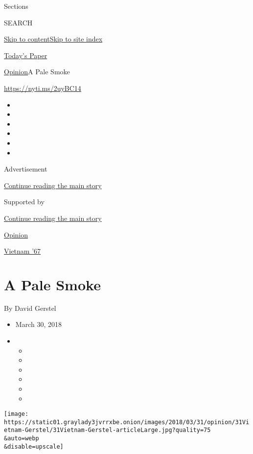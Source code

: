 Sections

SEARCH

\protect\hyperlink{site-content}{Skip to
content}\protect\hyperlink{site-index}{Skip to site index}

\href{https://myaccount.nytimes3xbfgragh.onion/auth/login?response_type=cookie\&client_id=vi}{}

\href{https://www.nytimes3xbfgragh.onion/section/todayspaper}{Today's
Paper}

\href{/section/opinion}{Opinion}\textbar{}A Pale Smoke

\url{https://nyti.ms/2uyBC14}

\begin{itemize}
\item
\item
\item
\item
\item
\item
\end{itemize}

Advertisement

\protect\hyperlink{after-top}{Continue reading the main story}

Supported by

\protect\hyperlink{after-sponsor}{Continue reading the main story}

\href{/section/opinion}{Opinion}

\href{/column/vietnam-67}{Vietnam '67}

\hypertarget{a-pale-smoke}{%
\section{A Pale Smoke}\label{a-pale-smoke}}

By David Gerstel

\begin{itemize}
\item
  March 30, 2018
\item
  \begin{itemize}
  \item
  \item
  \item
  \item
  \item
  \item
  \end{itemize}
\end{itemize}

\texttt{[image: https://static01.graylady3jvrrxbe.onion/images/2018/03/31/opinion/31Vietnam-Gerstel/31Vietnam-Gerstel-articleLarge.jpg?quality=75\\\&auto=webp\\\&disable=upscale]}

